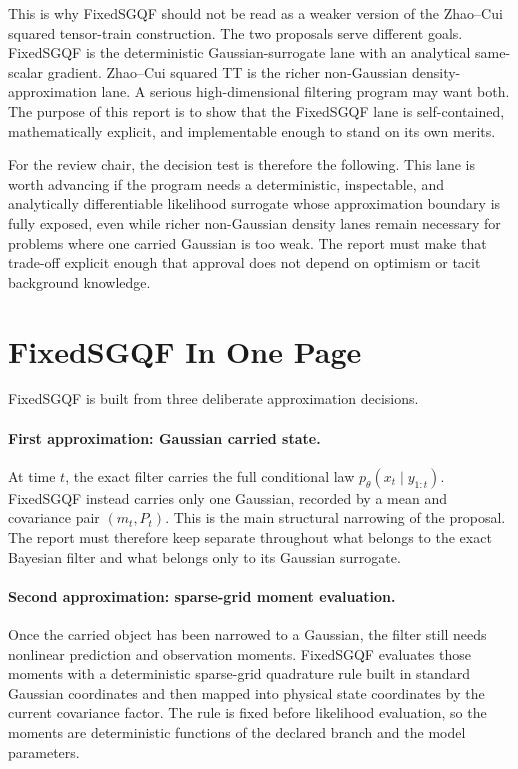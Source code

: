 \documentclass[11pt]{article}
\numberwithin{equation}{section}
\begin{document}
This is why FixedSGQF should not be read as a weaker version of the Zhao--Cui
squared tensor-train construction.  The two proposals serve different goals.
FixedSGQF is the deterministic Gaussian-surrogate lane with an analytical
same-scalar gradient.  Zhao--Cui squared TT is the richer non-Gaussian
density-approximation lane.  A serious high-dimensional filtering program may
want both.  The purpose of this report is to show that the FixedSGQF lane is
self-contained, mathematically explicit, and implementable enough to stand on
its own merits.

For the review chair, the decision test is therefore the following.  This lane
is worth advancing if the program needs a deterministic, inspectable, and
analytically differentiable likelihood surrogate whose approximation boundary is
fully exposed, even while richer non-Gaussian density lanes remain necessary for
problems where one carried Gaussian is too weak.  The report must make that
trade-off explicit enough that approval does not depend on optimism or tacit
background knowledge.

\section{FixedSGQF In One Page}
\label{sec:p32-one-page}

FixedSGQF is built from three deliberate approximation decisions.

\paragraph{First approximation: Gaussian carried state.}
At time \(t\), the exact filter carries the full conditional law
\(p_\theta(x_t\mid y_{1:t})\).  FixedSGQF instead carries only one Gaussian,
recorded by a mean and covariance pair \((m_t,P_t)\).  This is the main
structural narrowing of the proposal.  The report must therefore keep separate
throughout what belongs to the exact Bayesian filter and what belongs only to
its Gaussian surrogate.

\paragraph{Second approximation: sparse-grid moment evaluation.}
Once the carried object has been narrowed to a Gaussian, the filter still needs
nonlinear prediction and observation moments.  FixedSGQF evaluates those moments
with a deterministic sparse-grid quadrature rule built in standard Gaussian
coordinates and then mapped into physical state coordinates by the current
covariance factor.  The rule is fixed before likelihood evaluation, so the
moments are deterministic functions of the declared branch and the model
parameters.
\end{document}
